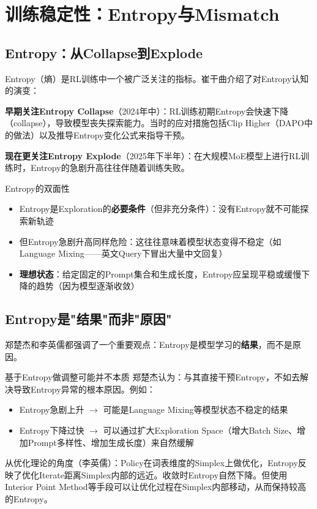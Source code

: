 \section{训练稳定性：Entropy与Mismatch}

\subsection{Entropy：从Collapse到Explode}

Entropy（熵）是RL训练中一个被广泛关注的指标。崔干曲介绍了对Entropy认知的演变：

\textbf{早期关注Entropy Collapse}（2024年中）：RL训练初期Entropy会快速下降（collapse），导致模型丧失探索能力。当时的应对措施包括Clip Higher（DAPO中的做法）以及推导Entropy变化公式来指导干预。

\textbf{现在更关注Entropy Explode}（2025年下半年）：在大规模MoE模型上进行RL训练时，Entropy的急剧升高往往伴随着训练失败。

\begin{importantbox}{Entropy的双面性}
\begin{itemize}
    \item Entropy是Exploration的\textbf{必要条件}（但非充分条件）：没有Entropy就不可能探索新轨迹
    \item 但Entropy急剧升高同样危险：这往往意味着模型状态变得不稳定（如Language Mixing——英文Query下冒出大量中文回复）
    \item \textbf{理想状态}：给定固定的Prompt集合和生成长度，Entropy应呈现平稳或缓慢下降的趋势（因为模型逐渐收敛）
\end{itemize}
\end{importantbox}

\subsection{Entropy是"结果"而非"原因"}

郑楚杰和李英儒都强调了一个重要观点：Entropy是模型学习的\textbf{结果}，而不是原因。

\begin{knowledgebox}{基于Entropy做调整可能并不本质}
郑楚杰认为：与其直接干预Entropy，不如去解决导致Entropy异常的根本原因。例如：
\begin{itemize}
    \item Entropy急剧上升 $\rightarrow$ 可能是Language Mixing等模型状态不稳定的结果
    \item Entropy下降过快 $\rightarrow$ 可以通过扩大Exploration Space（增大Batch Size、增加Prompt多样性、增加生成长度）来自然缓解
\end{itemize}
从优化理论的角度（李英儒）：Policy在词表维度的Simplex上做优化，Entropy反映了优化Iterate距离Simplex内部的远近。收敛时Entropy自然下降。但使用Interior Point Method等手段可以让优化过程在Simplex内部移动，从而保持较高的Entropy。
\end{knowledgebox}

